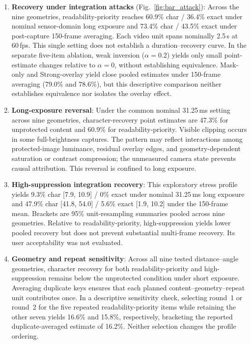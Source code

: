 \documentclass{ieeeaccess}
\begin{document}
\begin{enumerate}
\item \textbf{Recovery under integration attacks} (Fig.~\ref{fig:bar_attack}): Across the nine geometries, readability-priority reaches 60.9\% char / 36.4\% exact under nominal sensor-domain long exposure and 73.4\% char / 43.5\% exact under post-capture 150-frame averaging. Each video unit spans nominally 2.5\,s at 60\,fps. This single setting does not establish a duration--recovery curve. In the separate five-item ablation, weak inversion ($\alpha=0.2$) yields only small point-estimate changes relative to $\alpha=0$, without establishing equivalence. Mask-only and Strong-overlay yield close pooled estimates under 150-frame averaging (79.0\% and 78.6\%), but this descriptive comparison neither establishes equivalence nor isolates the overlay effect.

\item \textbf{Long-exposure reversal}: Under the common nominal 31.25\,ms setting across nine geometries, character-recovery point estimates are 47.3\% for unprotected content and 60.9\% for readability-priority. Visible clipping occurs in some full-brightness captures. The pattern may reflect interactions among protected-image luminance, residual overlay edges, and geometry-dependent saturation or contrast compression; the unmeasured camera state prevents causal attribution. This reversal is confined to long exposure.

\item \textbf{High-suppression integration recovery}: This exploratory stress profile yields 9.3\% char [7.9, 10.9] / 0\% exact under nominal 31.25\,ms long exposure and 47.9\% char [41.8, 54.0] / 5.6\% exact [1.9, 10.2] under the 150-frame mean. Brackets are 95\% unit-resampling summaries pooled across nine geometries. Relative to readability-priority, high-suppression yields lower pooled recovery but does not prevent substantial multi-frame recovery. Its user acceptability was not evaluated.

\item \textbf{Geometry and repeat sensitivity}: Across all nine tested distance--angle geometries, character recovery for both readability-priority and high-suppression remains below the unprotected condition under short exposure. Averaging duplicate keys ensures that each planned content--geometry--repeat unit contributes once. In a descriptive sensitivity check, selecting round~1 or round~2 for the five repeated readability-priority items while retaining the other seven yields 16.6\% and 15.8\%, respectively, bracketing the reported duplicate-averaged estimate of 16.2\%. Neither selection changes the profile ordering.
\end{enumerate}
\end{document}
